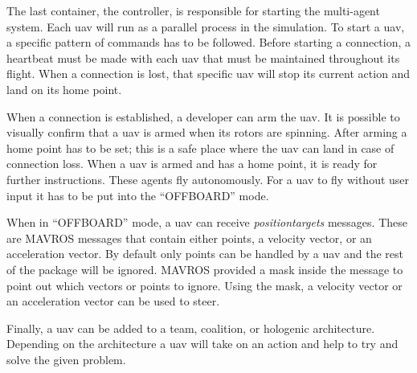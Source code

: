 The last container, the controller, is responsible for starting the multi-agent system. Each \acs{uav} 
will run as a parallel process in the simulation. 
To start a \acs{uav}, a specific pattern of commands has to be followed. Before starting a connection, 
a heartbeat must be made with each \acs{uav} 
that must be maintained throughout its flight. When a connection is lost, that specific \acs{uav} will 
stop its current action and land on its home point.

When a connection is established, a developer can arm the \acs{uav}. It is possible to visually 
confirm that a \acs{uav} is armed when its rotors are spinning. 
After arming a home point has to be set; this is a safe place where the \acs{uav} can land in case of 
connection loss. When a \acs{uav} is armed and has a 
home point, it is ready for further instructions. These agents fly autonomously. For a \acs{uav} to fly without 
user input it has to be put into the “OFFBOARD” mode. 

When in “OFFBOARD” mode, a \acs{uav} can receive \textit{positiontargets} messages. These are MAVROS messages that contain either 
points, a velocity vector, or an acceleration vector. By default only points can be handled by a \acs{uav} and the rest of the 
package will be ignored. MAVROS provided a mask inside the message to point out which vectors or points to ignore. Using the mask,
a velocity vector or an acceleration vector can be used to steer.

Finally, a \acs{uav} can be added to a team, coalition, or hologenic architecture. 
Depending on the architecture a \acs{uav} will take on an action and help to try and solve the given problem.

